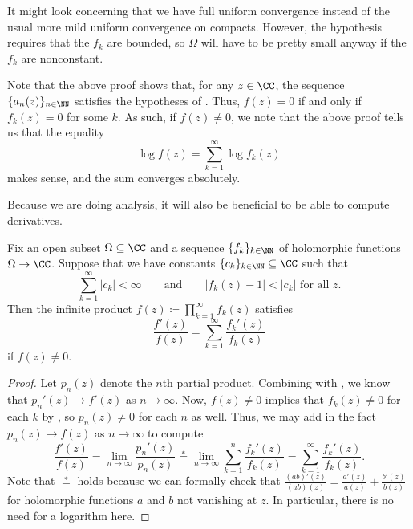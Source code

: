 \documentclass[notes.tex]{subfiles}
\begin{document}
\begin{remark}
	It might look concerning that we have full uniform convergence instead of the usual more mild uniform convergence on compacts. However, the hypothesis requires that the $f_k$ are bounded, so $\Omega$ will have to be pretty small anyway if the $f_k$ are nonconstant.
\end{remark}
\begin{remark} \label{rem:vanishing-prod-in-abs-conv}
	Note that the above proof shows that, for any $z\in\CC$, the sequence $\{a_n(z)\}_{n\in\NN}$ satisfies the hypotheses of . Thus, $f(z)=0$ if and only if $f_k(z)=0$ for some $k$. As such, if $f(z)\ne0$, we note that the above proof tells us that the equality
	\[\log f(z)=\sum_{k=1}^\infty\log f_k(z)\]
	makes sense, and the sum converges absolutely.
\end{remark}
Because we are doing analysis, it will also be beneficial to be able to compute derivatives.
\begin{corollary}
	Fix an open subset $\Omega\subseteq\CC$ and a sequence $\{f_k\}_{k\in\NN}$ of holomorphic functions $\Omega\to\CC$. Suppose that we have constants $\{c_k\}_{k\in\NN}\subseteq\CC$ such that
	\[\sum_{k=1}^\infty|c_k|<\infty\qquad\text{and}\qquad|f_k(z)-1|<|c_k|\text{ for all }z.\]
	Then the infinite product $f(z)\coloneqq\prod_{k=1}^\infty f_k(z)$ satisfies
	\[\frac{f'(z)}{f(z)}=\sum_{k=1}^\infty\frac{f_k'(z)}{f_k(z)}\]
	if $f(z)\ne0$.
\end{corollary}
\begin{proof}
	Let $p_n(z)$ denote the $n$th partial product. Combining  with , we know that $p_n'(z)\to f'(z)$ as $n\to\infty$. Now, $f(z)\ne0$ implies that $f_k(z)\ne0$ for each $k$ by , so $p_n(z)\ne0$ for each $n$ as well. Thus, we may add in the fact $p_n(z)\to f(z)$ as $n\to\infty$ to compute
	\[\frac{f'(z)}{f(z)}=\lim_{n\to\infty}\frac{p_n'(z)}{p_n(z)}\stackrel*=\lim_{n\to\infty}\sum_{k=1}^n\frac{f_k'(z)}{f_k(z)}=\sum_{k=1}^\infty\frac{f_k'(z)}{f_k(z)}.\]
	Note that $\stackrel*=$ holds because we can formally check that $\frac{(ab)'(z)}{(ab)(z)}=\frac{a'(z)}{a(z)}+\frac{b'(z)}{b(z)}$ for holomorphic functions $a$ and $b$ not vanishing at $z$. In particular, there is no need for a logarithm here.
\end{proof}
\end{document}
